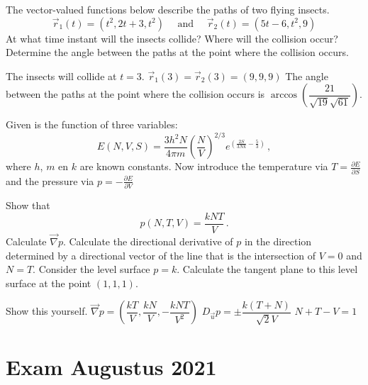 	
\begin{Exercise} %
The vector-valued functions below describe the paths of two flying insects.
\[ \vec{r}_1(t) = \left(t^2, 2t + 3, t^2 \right) \quad \text{ and } \quad  \vec{r}_2(t) = \left(5t-6, t^2,9 \right)  \]
\Question At what time instant will the insects collide?
\Question Where will the collision occur?
\Question Determine the angle between the paths at the point where the collision occurs.
\end{Exercise} 

\begin{Answer}
\Question The insects will collide at $t=3$.
\Question $\vec{r}_1(3) = \vec{r}_2(3) = (9,9,9)$
\Question The angle between the paths at the point where the collision occurs is $\arccos \left( \dfrac{21}{\sqrt{19} \sqrt{61}}\right) $.
\end{Answer}



\begin{Exercise} %
Given is the function of three variables:
$$
E(N,V,S)=\dfrac{3h^2N}{4\pi m}\left(\dfrac{N}{V}\right)^{2/3}e^{\left(\frac{2S}{3Nk}-\frac{5}{3}\right)}\,,
$$
where $h$, $m$ en $k$ are known constants. Now introduce the temperature via $T=\frac{\partial E}{\partial S}$ and the pressure via $p=-\frac{\partial E}{\partial V}$

\Question Show that 
    $$p(N,T,V)=\dfrac{kNT}{V}\,.$$
\Question Calculate $\vec{\nabla} p$.
\Question Calculate the directional derivative of $p$ in the direction determined by a directional vector of the line that is the intersection of $V=0$ and $N=T$.
\Question Consider the level surface $p=k$. Calculate the tangent plane to this level surface at the point $(1,1,1)$.
\EndCurrentQuestion
\end{Exercise} 


\begin{Answer}
\Question Show this yourself.
\Question $\vec{\nabla} p = \left(\dfrac{kT}{V}, \dfrac{kN}{V}, -\dfrac{kNT}{V^2}\right)$
\Question $D_{\vec{u}} p = \pm \dfrac{k(T+N)}{\sqrt{2} V}$
\Question $N+T-V = 1$
\end{Answer}


\section{Exam Augustus 2021}

